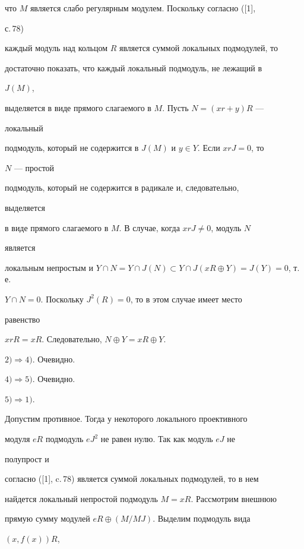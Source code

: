 что $M$ является слабо регулярным модулем. Поскольку согласно ([1], 


с.\,78) 


каждый модуль над кольцом $R$ является суммой локальных подмодулей, то 


достаточно показать, что каждый локальный подмодуль, не лежащий в 


$J(M)$, 


выделяется в виде прямого слагаемого в $M$. Пусть $N=(xr+y)R$ --- 


локальный 


подмодуль, который не содержится в $J(M)$ и $y\in Y$. Если $xrJ=0$, то 


$N$ --- простой 


подмодуль, который не содержится в радикале и, следовательно, 


выделяется 


в виде прямого слагаемого в $M$. В случае, когда $xrJ\ne0$, модуль $N$ 


является 


локальным непростым и $Y\cap N=Y\cap J(N)\subset Y\cap J(xR\oplus 


Y)=J(Y)=0$, т.\,е. 


$Y\cap N=0$. Поскольку $J^2(R)=0$, то в этом случае имеет место 


равенство 


$xrR=xR$. Следовательно, $N\oplus Y=xR\oplus Y$. 


 


$2)\Rightarrow 4)$. Очевидно. 


 


$4)\Rightarrow 5)$. Очевидно. 


 


$5)\Rightarrow 1)$. 


Допустим противное. Тогда у некоторого локального проективного 


модуля $eR$ подмодуль $eJ^2$ не равен нулю. Так как модуль $eJ$ не 


полупрост и 


согласно ([1], c.\,78) является суммой локальных подмодулей, то в нем 


найдется локальный непростой подмодуль $M=xR$. Рассмотрим внешнюю 


прямую сумму модулей $eR\oplus(M/MJ)$. Выделим подмодуль вида 


$(x,f(x))R$, 


